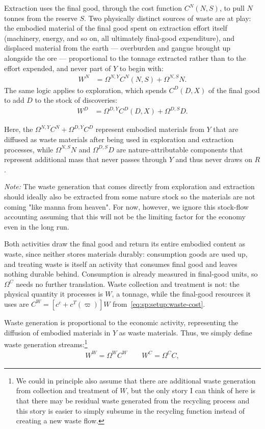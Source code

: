  Extraction uses the final good, through the cost function $C^N(N,S)$, to pull $N$ tonnes from the reserve $S$. Two physically distinct sources of waste are at play: the embodied material of the final good spent on extraction effort itself (machinery, energy, and so on, all ultimately final-good expenditure), and displaced material from the earth --- overburden and gangue brought up alongside the ore --- proportional to the tonnage extracted rather than to the effort expended, and never part of $Y$ to begin with:
\begin{align}
W^N &= \Omega^{N,Y}C^N(N,S)+\Omega^{N,S}N.
\label{eq:sp:setup:extraction}
\end{align}
The same logic applies to exploration, which spends $C^D(D,X)$ of the final good to add $D$ to the stock of discoveries:
\begin{align}
W^D &= \Omega^{D,Y}C^D(D,X)+\Omega^{D,S}D.
\label{eq:sp:setup:exploration}
\end{align}

Here, the $\Omega^{N,Y}C^N+\Omega^{D,Y}C^D$ represent embodied materials from $Y$ that are diffused as waste materials after being used in exploration and extraction processes, while $\Omega^{N,S} N $ and $\Omega^{D,S} D$ are nature-attributable components that represent additional mass that never passes through $Y$ and thus never draws on $R$. 

\textit{Note:} The waste generation that comes directly from exploration and extraction should ideally also be extracted from some nature stock so the materials are not coming "like manna from heaven". For now, however, we ignore this stock-flow accounting assuming that this will not be the limiting factor for the economy even in the long run.




 Both activities draw the final good and return its entire embodied content as waste, since neither stores materials durably: consumption goods are used up, and treating waste is itself an activity that consumes final good and leaves nothing durable behind. Consumption is already measured in final-good units, so $\Omega^C$ needs no further translation. Waste collection and treatment is not: the physical quantity it processes is $W$, a tonnage, while the final-good resources it uses are $C^W=\left[c^c+c^T(\varpi)\right]W$ from~\eqref{eq:sp:setup:waste-cost}. 


Waste generation is proportional to the economic activity, representing the diffusion of embodied materials in $Y$ as waste materials. Thus, we simply define waste generation streams:\footnote{We could in principle also assume that there are additional waste generation from collection and treatment of $W$, but the only story I can think of here is that there may be residual waste generated from the recycling process and this story is easier to simply subsume in the recycling function instead of creating a new waste flow.}
\begin{align}
    W^W = \Omega^{W} C^W \qquad W^C= \Omega^C C, \label{eq:sp:setup:wc}
\end{align}



